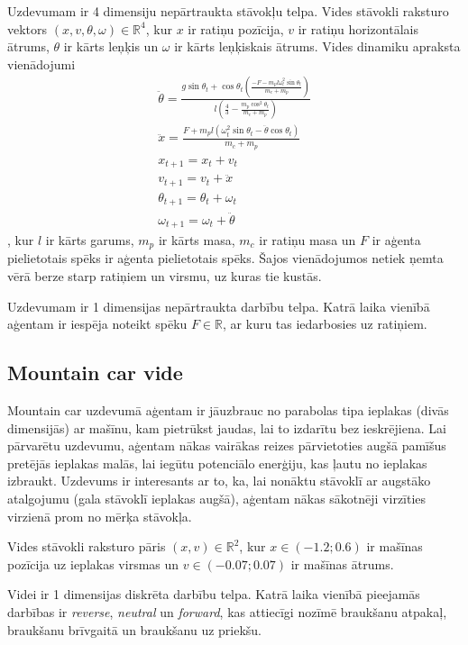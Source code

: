 \documentclass{ludis} %
\begin{document}
Uzdevumam ir 4 dimensiju nepārtraukta stāvokļu telpa. Vides stāvokli raksturo
vektors $(x, v, \theta, \omega) \in \mathbb{R}^4$, kur $x$ ir ratiņu pozīcija,
$v$ ir ratiņu horizontālais ātrums, $\theta$ ir kārts leņķis un $\omega$ ir
kārts leņķiskais ātrums. Vides dinamiku apraksta vienādojumi
\begin{gather}
  \ddot{\theta} = \frac{g \sin\theta_t + \cos\theta_t \left(\frac{-F - m_p l \omega_t^2\sin\theta_t}
                                                         {m_c + m_p}\right)}
                        {l \left(\frac{4}{3} - \frac{m_p\cos^2\theta_t}
                                               {m_c + m_p}\right)} \\ 
  \ddot{x} = \frac{F + m_p l \left(\omega_t^2\sin\theta_t - \ddot{\theta}\cos\theta_t\right)}
                   {m_c + m_p} \\
  x_{t+1} = x_t + v_t \\
  v_{t+1} = v_t + \ddot{x} \\
  \theta_{t+1} = \theta_t + \omega_t \\
  \omega_{t+1} = \omega_t + \ddot{\theta}
\end{gather},
kur $l$ ir kārts garums, $m_p$ ir kārts masa, $m_c$ ir ratiņu masa un $F$ ir
aģenta pielietotais spēks ir aģenta pielietotais spēks. Šajos vienādojumos
netiek ņemta vērā berze starp ratiņiem un virsmu, uz kuras tie kustās.

Uzdevumam ir 1 dimensijas nepārtraukta darbību telpa. Katrā laika vienībā
aģentam ir iespēja noteikt spēku $F \in \mathbb{R}$, ar kuru tas iedarbosies uz
ratiņiem.

\subsection{Mountain car vide}
Mountain car uzdevumā aģentam ir jāuzbrauc no parabolas tipa ieplakas (divās
dimensijās) ar mašīnu, kam pietrūkst jaudas, lai to izdarītu bez ieskrējiena.
Lai pārvarētu uzdevumu, aģentam nākas vairākas reizes pārvietoties augšā
pamīšus pretējās ieplakas malās, lai iegūtu potenciālo enerģiju, kas ļautu no
ieplakas izbraukt. Uzdevums ir interesants ar to, ka, lai nonāktu stāvoklī ar
augstāko atalgojumu (gala stāvoklī ieplakas augšā), aģentam nākas sākotnēji
virzīties virzienā prom no mērķa stāvokļa.

Vides stāvokli raksturo pāris $(x, v) \in \mathbb{R}^2$, kur $x \in (-1.2; 0.6)$
ir mašīnas pozīcija uz ieplakas virsmas un $v \in (-0.07; 0.07)$ ir mašīnas
ātrums.

Videi ir 1 dimensijas diskrēta darbību telpa. Katrā laika vienībā pieejamās
darbības ir \textit{reverse}, \textit{neutral} un \textit{forward}, kas
attiecīgi nozīmē braukšanu atpakaļ, braukšanu brīvgaitā un braukšanu uz
priekšu.
\end{document}
